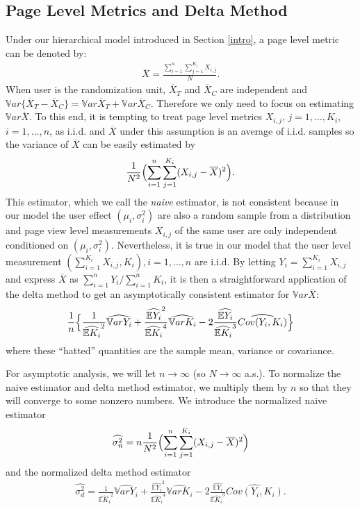 \documentclass[11pt]{asaproc}
\newcommand{\wht}{\widehat}
\newcommand{\var}{\ensuremath{\mathbb Var}}
\newcommand{\bbe}{\mathbb{E}}
\newcommand{\xbar}{\overline{X}}
\begin{document}
\subsection{Page Level Metrics and Delta Method}\label{user-page}
Under our hierarchical model introduced in Section \ref{intro}, a page level metric can be denoted by:
\begin{align*}
\xbar= \frac{\sum_{i=1}^n\sum_{j=1}^{K_i} X_{i,j}}{N}.
\end{align*}
When user is the randomization unit, $\xbar_T$ and $\xbar_C$ are independent and $\var \{\xbar_T-\xbar_C\} = \var \xbar_T + \var \xbar_C$. Therefore we only need to focus on estimating $\var \xbar$. To this end, it is tempting to treat page level metrics $X_{i,j}$, $j=1,\dots,K_i$, $i=1,\dots,n$, as i.i.d. and $\xbar$ under this assumption is an average of i.i.d. samples so the variance of $\xbar$ can be easily estimated by
\begin{align*}
\frac{1}{N^2} \Bigl (\sum_{i=1}^n \sum_{j=1}^{K_i} (X_{i,j}-\overline{X})^2 \Bigr ).
\end{align*}
This estimator, which we call the \emph{naive} estimator,  is not consistent because in our model the user effect $(\mu_i,\sigma_i^2)$ are also a random sample from a distribution and page view level measurements $X_{i,j}$ of the same user are only independent conditioned on $(\mu_i,\sigma_i^2)$. Nevertheless, it is true in our model that the user level measurement $(\sum_{i=1}^{K_i} X_{i,j}, K_i),i=1,\dots,n$ are i.i.d. By letting $Y_i = \sum_{i=1}^{K_i} X_{i,j}$ and express $\xbar$ as $\sum_{i=1}^n Y_i / \sum_{i=1}^n K_i$, it is then a straightforward application of the delta method to get an asymptotically consistent estimator for $\var \xbar$:
\begin{align*}
\frac{1}{n} \Bigl\{ \frac{1}{\wht{\bbe K_i}^2}\wht{\var Y_i} + \frac{\wht{\bbe Y_i}^2}{\wht{\bbe K_i}^4}\wht{\var K_i} - 2\frac{\wht{\bbe Y_i}}{\wht{\bbe K_i}^3} \wht{Cov(Y_i,K_i)} \Bigr\} 
\end{align*}
where these ``hatted'' quantities are the sample mean, variance or covariance. 

For asymptotic analysis, we will let $n\to \infty$ (so $N\to \infty$ a.s.). To normalize the naive estimator and delta method estimator, we multiply them by $n$ so that they will converge to some nonzero numbers.  We introduce the normalized naive estimator 
\begin{align}
\wht{\sigma^2_n} = n\frac{1}{N^2} \Bigl (\sum_{i=1}^n \sum_{j=1}^{K_i} (X_{i,j}-\overline{X})^2 \Bigr )
\end{align}
and the normalized delta method estimator
\begin{align}
\wht{\sigma^2_d} = \frac{1}{\wht{\bbe K_i}^2}\wht{\var Y_i} + \frac{\wht{\bbe Y_i}^2}{\wht{\bbe K_i}^4}\wht{\var K_i} - 2\frac{\wht{\bbe Y_i}}{\wht{\bbe K_i}^3} \wht{Cov(Y_i,K_i)}.
\end{align}
\end{document}
